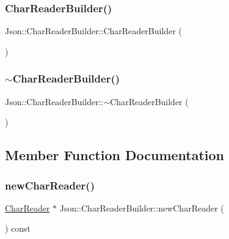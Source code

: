 \subsubsection{\texorpdfstring{Char\+Reader\+Builder()}{CharReaderBuilder()}}
{\footnotesize\ttfamily Json\+::\+Char\+Reader\+Builder\+::\+Char\+Reader\+Builder (\begin{DoxyParamCaption}{ }\end{DoxyParamCaption})}

\mbox{\label{classJson_1_1CharReaderBuilder_ae8226503f5b947e9d618c39dd992c85c_ae8226503f5b947e9d618c39dd992c85c}} 
\subsubsection{\texorpdfstring{$\sim$\+Char\+Reader\+Builder()}{~CharReaderBuilder()}}
{\footnotesize\ttfamily Json\+::\+Char\+Reader\+Builder\+::$\sim$\+Char\+Reader\+Builder (\begin{DoxyParamCaption}{ }\end{DoxyParamCaption})}



\subsection{Member Function Documentation}
\mbox{\label{classJson_1_1CharReaderBuilder_a3a262fcc76c1eb8eebfd4718fb4e9722_a3a262fcc76c1eb8eebfd4718fb4e9722}} 
\subsubsection{\texorpdfstring{new\+Char\+Reader()}{newCharReader()}}
{\footnotesize\ttfamily \hyperlink{classJson_1_1CharReader}{Char\+Reader} $\ast$ Json\+::\+Char\+Reader\+Builder\+::new\+Char\+Reader (\begin{DoxyParamCaption}{ }\end{DoxyParamCaption}) const\hspace{0.3cm}{\ttfamily [virtual]}}



